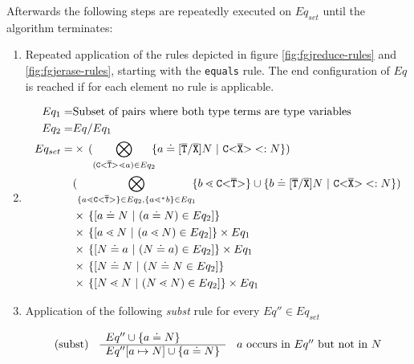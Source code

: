 Afterwards the following steps are repeatedly executed on $Eq_{set}$ until the algorithm terminates:

\begin{enumerate}
\item Repeated application of the rules depicted in figure \ref{fig:fgjreduce-rules} and \ref{fig:fgjerase-rules},
starting with the \texttt{equals} rule.
The end configuration of $Eq$ is reached if for each element no rule is applicable.
\item
\begin{align*}
Eq_1 =& \text{Subset of pairs where both type terms are type variables}\\
Eq_2 =& Eq / Eq_1 \\
Eq_{set}
    = 
    & \times\, 
    (\displaystyle{\bigotimes_{(\mathtt{C {\tt <} \overline{T} {\tt >} } \lessdot a) \in Eq_2}}\!\!
    \{ a \doteq [\overline{\tt T}/\overline{\tt X}]N \ | \ \mathtt{C {\tt <} \overline{X} {\tt >} } <: N  \})\\
    & (\displaystyle{\bigotimes_{\{ a \lessdot \mathtt{C {\tt <} \overline{T} {\tt >} } \}  \in Eq_2, \{  a \lessdot^* b \}  \in Eq_1}}\!\!
    \{  b \lessdot \mathtt{C {\tt <} \overline{\tt T} {\tt >} } \} \cup \{ b \doteq [\overline{\tt T}/\overline{\tt X}]N \ | \ \mathtt{C {\tt <} \overline{X} {\tt >} } <: N  \})\\
    & \times\, \{ [a \doteq N \ | \  (a \doteq N) \in Eq_2] \} \\
    & \times\, \{ [a \lessdot N \ | \  (a \lessdot N) \in Eq_2] \} \times Eq_1 \\
    & \times\, \{ [N \doteq a \ | \  (N \doteq a) \in Eq_2] \} \times Eq_1 \\
    & \times\, \{ [N \doteq N \ | \  (N \doteq N \in Eq_2] \} \\
    & \times\, \{ [N \lessdot N \ | \  (N \lessdot N) \in Eq_2] \} \times Eq_1 \\
\end{align*}
\item \label{subst-step}  Application of the following \emph{subst} rule for every $Eq'' \in Eq_{set}$
    
      $$\begin{array}[c]{lll}
        (\mathrm{subst}) &
        \begin{array}[c]{l}
          Eq'' \cup \{ a \doteq N \}\\
          \hline
          Eq''[a \mapsto N] \cup \{ a \doteq N \}
        \end{array}
        & a \textrm{ occurs in } Eq'' \textrm{ but not in } N
      \end{array}$$
      

\end{enumerate}
